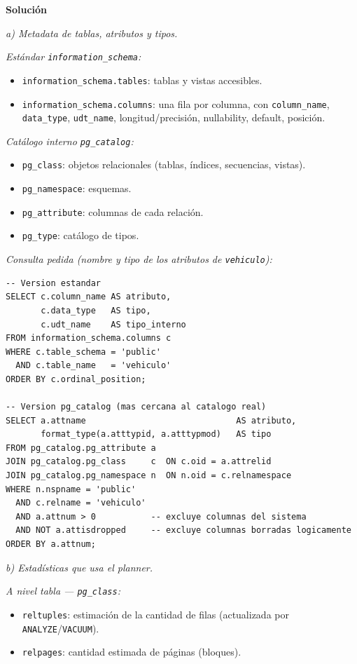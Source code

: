 \documentclass[11pt,a4paper]{article}
\newcommand{\itemcabecera}[1]{\noindent\textbf{#1}\par\medskip}
\newcommand{\bloqueSolucion}{\itemcabecera{Soluci\'on}}
\begin{document}
\bloqueSolucion

\textit{a) Metadata de tablas, atributos y tipos.}

\textit{Estándar \texttt{information\_schema}:}
\begin{itemize}
    \item \texttt{information\_schema.tables}: tablas y vistas accesibles.
    \item \texttt{information\_schema.columns}: una fila por columna, con \texttt{column\_name}, \texttt{data\_type}, \texttt{udt\_name}, longitud/precisión, nullability, default, posición.
\end{itemize}

\textit{Catálogo interno \texttt{pg\_catalog}:}
\begin{itemize}
    \item \texttt{pg\_class}: objetos relacionales (tablas, índices, secuencias, vistas).
    \item \texttt{pg\_namespace}: esquemas.
    \item \texttt{pg\_attribute}: columnas de cada relación.
    \item \texttt{pg\_type}: catálogo de tipos.
\end{itemize}

\textit{Consulta pedida (nombre y tipo de los atributos de \texttt{vehiculo}):}

\begin{lstlisting}
-- Version estandar
SELECT c.column_name AS atributo,
       c.data_type   AS tipo,
       c.udt_name    AS tipo_interno
FROM information_schema.columns c
WHERE c.table_schema = 'public'
  AND c.table_name   = 'vehiculo'
ORDER BY c.ordinal_position;

-- Version pg_catalog (mas cercana al catalogo real)
SELECT a.attname                              AS atributo,
       format_type(a.atttypid, a.atttypmod)   AS tipo
FROM pg_catalog.pg_attribute a
JOIN pg_catalog.pg_class     c  ON c.oid = a.attrelid
JOIN pg_catalog.pg_namespace n  ON n.oid = c.relnamespace
WHERE n.nspname = 'public'
  AND c.relname = 'vehiculo'
  AND a.attnum > 0           -- excluye columnas del sistema
  AND NOT a.attisdropped     -- excluye columnas borradas logicamente
ORDER BY a.attnum;
\end{lstlisting}

\textit{b) Estadísticas que usa el planner.}

\textit{A nivel tabla --- \texttt{pg\_class}:}
\begin{itemize}
    \item \texttt{reltuples}: estimación de la cantidad de filas (actualizada por \texttt{ANALYZE}/\texttt{VACUUM}).
    \item \texttt{relpages}: cantidad estimada de páginas (bloques).
\end{itemize}
\end{document}
